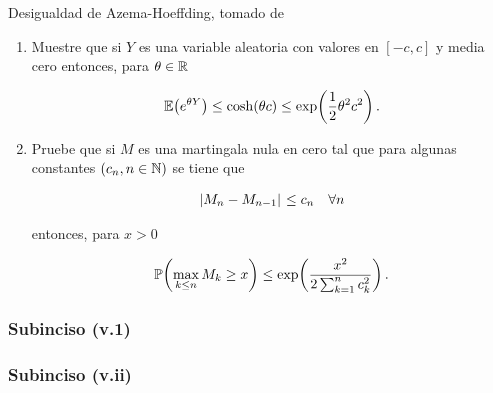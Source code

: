 Desigualdad de Azema-Hoeffding, tomado de \par
\cite[E14.2, p.237]{MR1155402}\par\null

\begin{enumerate}
    \item[(v.i)]    [\ref{problema2_3:subinciso5_1}]
         Muestre que si $Y$ es una variable aleatoria con valores en $[-c,c]$ y media cero entonces, para $\theta\in\mathbb{R}$
        
        \begin{align}
            \mathbb{E}\! \left( e^{\theta Y} \right)\leq\cosh\!\left( \theta c\right) \leq \exp\!\left( \frac{1}{2}\theta^2c^2\right) . 
        \end{align}\par\null

    \item[(v.ii)]    [\ref{problema2_3:subinciso5_2}]
        Pruebe que si $M$ es una martingala nula en cero tal que para algunas constantes $\left( c_n,n\in\mathbb{N}\right) $ se tiene que
        
        \begin{align}
            \hspace{.25mm}\left|M_n-M_{n-1}\right|\hspace{.25mm}\leq c_n\quad\forall n
        \end{align}
        
        entonces, para $x>0$
        
        \begin{align}
            \mathbb{P}\! \left( \max_{k\leq n} M_k\geq x \right)\leq \exp\!\left( \frac{x^2}{2\sum_{k=1}^n c_k^2}\right) .
        \end{align}
\end{enumerate}
    
\subsubsection{Subinciso (v.1)}     \label{problema2_3:subinciso5_1}
    
    \newpage
    
\subsubsection{Subinciso (v.ii)}    \label{problema2_3:subinciso5_2} 
    

